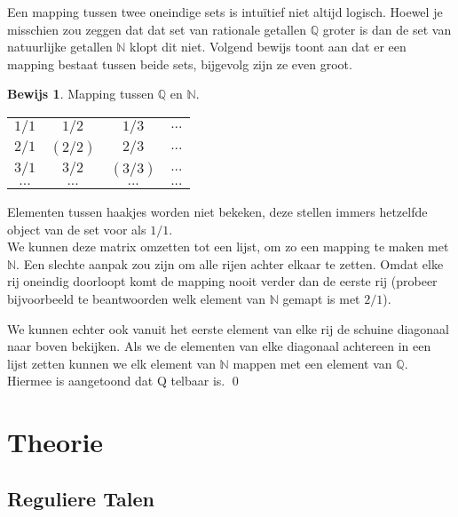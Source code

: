 \documentclass[12pt,a4paper]{article}
\theoremstyle{definition}
\newtheorem{bewijs}{Bewijs}[section]
\begin{document}
	Een mapping tussen twee oneindige sets is intuïtief niet altijd logisch. Hoewel je misschien zou zeggen dat dat set van rationale getallen $\mathbb{Q}$ groter is dan de set van natuurlijke getallen $\mathbb{N}$ klopt dit niet. Volgend bewijs toont aan dat er een mapping bestaat tussen beide sets, bijgevolg zijn ze even groot.
	\begin{bewijs}
		Mapping tussen $\mathbb{Q}$ en $\mathbb{N}$.
		\begin{table}[H]
			\centering
			\begin{tabular}{|c|c|c|c|}
				\hline $1/1$ & $1/2$ & $1/3$ & $...$\\ 
				$2/1$ & $(2/2)$ & $2/3$ & $...$\\ 
				$3/1$ & $3/2$ & $(3/3)$ & $...$\\ 
				$...$ & $...$ & $...$ & $...$\\ 
				\hline 
			\end{tabular}
		\end{table}
		Elementen tussen haakjes worden niet bekeken, deze stellen immers hetzelfde object van de set voor als $1/1$. \\
		
		We kunnen deze matrix omzetten tot een lijst, om zo een mapping te maken met $\mathbb{N}$. Een slechte aanpak zou zijn om alle rijen achter elkaar te zetten. Omdat elke rij oneindig doorloopt komt de mapping nooit verder dan de eerste rij (probeer bijvoorbeeld te beantwoorden welk element van $\mathbb{N}$ gemapt is met $2/1$). 
		
		We kunnen echter ook vanuit het eerste element van elke rij de schuine diagonaal naar boven bekijken. Als we de elementen van elke diagonaal achtereen in een lijst zetten kunnen we elk element van $\mathbb{N}$ mappen met een element van $\mathbb{Q}$. Hiermee is aangetoond dat Q telbaar is. \qed
	\end{bewijs}
	
	
\newpage
\section{Theorie}
\subsection{Reguliere Talen}
\end{document}
